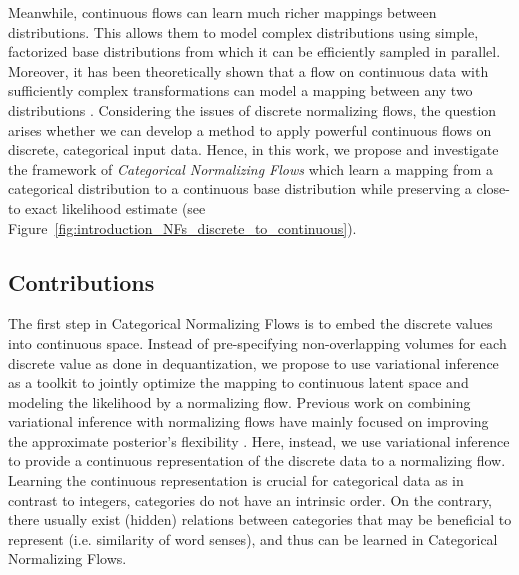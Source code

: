 Meanwhile, continuous flows can learn much richer mappings between distributions. 
This allows them to model complex distributions using simple, factorized base distributions from which it can be efficiently sampled in parallel. 
Moreover, it has been theoretically shown that a flow on continuous data with sufficiently complex transformations can model a mapping between any two distributions \cite{NormalizingFlowsOriginalMathConcept, NormalizingFlowsOverview2}. 
Considering the issues of discrete normalizing flows, the question arises whether we can develop a method to apply powerful continuous flows on discrete, categorical input data.
Hence, in this work, we propose and investigate the framework of \emph{Categorical Normalizing Flows} which learn a mapping from a categorical distribution to a continuous base distribution while preserving a close-to exact likelihood estimate (see Figure~\ref{fig:introduction_NFs_discrete_to_continuous}). 




\subsection{Contributions}
\label{sec:introduction_contributions}

The first step in Categorical Normalizing Flows is to embed the discrete values into continuous space. 
Instead of pre-specifying non-overlapping volumes for each discrete value as done in dequantization, we propose to use variational inference as a toolkit to jointly optimize the mapping to continuous latent space and modeling the likelihood by a normalizing flow.
Previous work on combining variational inference with normalizing flows have mainly focused on improving the approximate posterior's flexibility \cite{InverseAutoregressiveFlows, NormalizingFlowsFundamentals, SylvesterNF}. 
Here, instead, we use variational inference to provide a continuous representation of the discrete data to a normalizing flow. 
Learning the continuous representation is crucial for categorical data as in contrast to integers, categories do not have an intrinsic order. On the contrary, there usually exist (hidden) relations between categories that may be beneficial to represent (i.e. similarity of word senses), and thus can be learned in Categorical Normalizing Flows.

